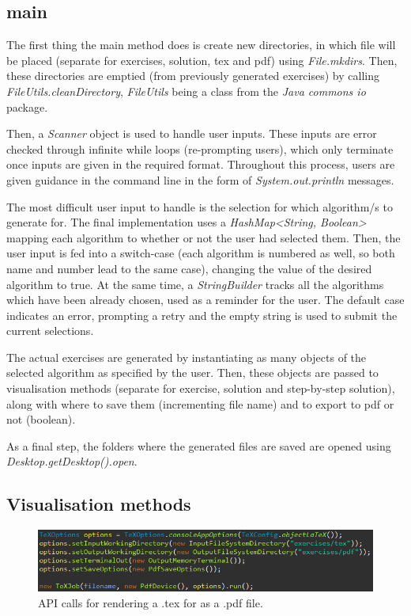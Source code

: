 \documentclass{l4proj}
\begin{document}
\subsection{main}

The first thing the main method does is create new directories, in which file will be placed (separate for exercises, solution, tex and pdf) using \emph{File.mkdirs}. Then, these directories are emptied (from previously generated exercises) by calling \emph{FileUtils.cleanDirectory}, \emph{FileUtils} being a class from the \emph{Java commons io} package.

Then, a \emph{Scanner} object is used to handle user inputs. These inputs are error checked through infinite while loops (re-prompting users), which only terminate once inputs are given in the required format. Throughout this process, users are given guidance in the command line in the form of \emph{System.out.println} messages.

The most difficult user input to handle is the selection for which algorithm/s to generate for. The final implementation uses a \emph{HashMap<String, Boolean>} mapping each algorithm to whether or not the user had selected them. Then, the user input is fed into a switch-case (each algorithm is numbered as well, so both name and number lead to the same case), changing the value of the desired algorithm to true. At the same time, a \emph{StringBuilder} tracks all the algorithms which have been already chosen, used as a reminder for the user. The default case indicates an error, prompting a retry and the empty string is used to submit the current selections.

The actual exercises are generated by instantiating as many objects of the selected algorithm as specified by the user. Then, these objects are passed to visualisation methods (separate for exercise, solution and step-by-step solution), along with where to save them (incrementing file name) and to export to pdf or not (boolean).

As a final step, the folders where the generated files are saved are opened using \emph{Desktop.getDesktop().open}.

\subsection{Visualisation methods}

\begin{figure}
    \centering
    \includegraphics[width=0.9\linewidth]{images/pdf.png}    

    \caption{API calls for rendering a .tex for as a .pdf file.}
    \label{fig:pdf} 
\end{figure}
\end{document}
